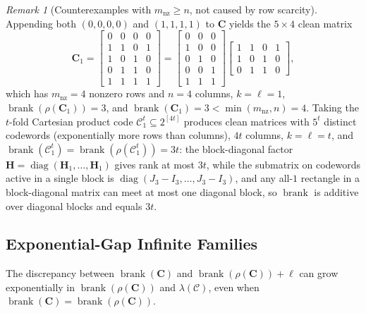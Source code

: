 \documentclass[11pt]{article}
\theoremstyle{plain}
\theoremstyle{definition}
\theoremstyle{remark}
\newtheorem{remark}[theorem]{Remark}
\DeclareMathOperator{\brank}{brank}
\DeclareMathOperator{\diag}{diag}
\begin{document}
\begin{remark}[Counterexamples with $m_{\mathrm{nz}} \ge n$, not caused by row scarcity]\label{rmk:manyrows}
Appending both $(0,0,0,0)$ and $(1,1,1,1)$ to $\mathbf{C}$ yields the $5 \times 4$ clean matrix
\[
\mathbf{C}_1 = \begin{bmatrix} 0 & 0 & 0 & 0 \\ 1 & 1 & 0 & 1 \\ 1 & 0 & 1 & 0 \\ 0 & 1 & 1 & 0 \\ 1 & 1 & 1 & 1 \end{bmatrix}
= \begin{bmatrix} 0 & 0 & 0 \\ 1 & 0 & 0 \\ 0 & 1 & 0 \\ 0 & 0 & 1 \\ 1 & 1 & 1 \end{bmatrix}
\begin{bmatrix} 1 & 1 & 0 & 1 \\ 1 & 0 & 1 & 0 \\ 0 & 1 & 1 & 0 \end{bmatrix},
\]
which has $m_{\mathrm{nz}} = 4$ nonzero rows and $n = 4$ columns, $k = \ell = 1$, $\brank(\rho(\mathbf{C}_1)) = 3$, and $\brank(\mathbf{C}_1) = 3 < \min(m_{\mathrm{nz}}, n) = 4$.
Taking the $t$-fold Cartesian product code $\mathcal{C}_1^t \subseteq 2^{[4t]}$ produces clean matrices with $5^t$ distinct codewords (exponentially more rows than columns), $4t$ columns, $k = \ell = t$, and $\brank(\mathcal{C}_1^t) = \brank(\rho(\mathcal{C}_1^t)) = 3t$: the block-diagonal factor $\mathbf{H} = \diag(\mathbf{H}_1, \dots, \mathbf{H}_1)$ gives rank at most $3t$, while the submatrix on codewords active in a single block is $\diag(J_3 - I_3, \dots, J_3 - I_3)$, and any all-$1$ rectangle in a block-diagonal matrix can meet at most one diagonal block, so $\brank$ is additive over diagonal blocks and equals $3t$.
\end{remark}

\subsection{Exponential-Gap Infinite Families}

The discrepancy between $\brank(\mathbf{C})$ and $\brank(\rho(\mathbf{C})) + \ell$ can grow exponentially in $\brank(\rho(\mathbf{C}))$ and $\lambda(\mathcal{C})$, even when $\brank(\mathbf{C}) = \brank(\rho(\mathbf{C}))$.
\end{document}
